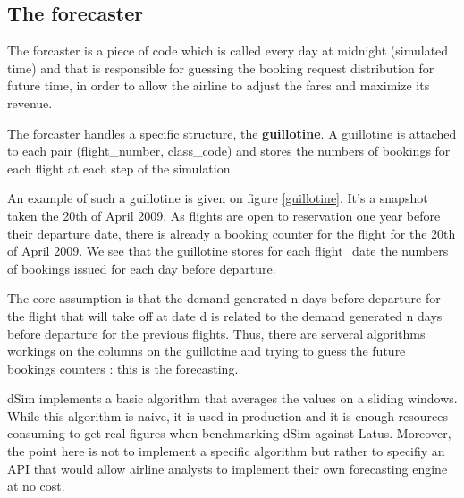 \documentclass[11pt]{JHEP3}
\begin{document}
\subsection{The forecaster}

The forcaster is a piece of code which is called every day at midnight
(simulated time) and that is responsible for guessing the booking
request distribution for future time, in order to allow the airline to
adjust the fares and maximize its revenue.

The forcaster handles a specific structure, the \textbf{guillotine}. A
guillotine is attached to each pair (flight\_number, class\_code) and
stores the numbers of bookings for each flight at each step of the
simulation.


An example of such a guillotine is given on figure
\ref{guillotine}. It's a snapshot taken the 20th of April 2009. As
flights are open to reservation one year before their departure date,
there is already a booking counter for the flight for the 20th of
April 2009. We see that the guillotine stores for each flight\_date
the numbers of bookings issued for each day before departure.

The core assumption is that the demand generated n days before
departure for the flight that will take off at date d is related to
the demand generated n days before departure for the previous
flights. Thus, there are serveral algorithms workings on the columns
on the guillotine and trying to guess the future bookings counters :
this is the forecasting.

dSim implements a basic algorithm that averages the values on a
sliding windows. While this algorithm is naive, it is used in
production and it is enough resources consuming to get real figures
when benchmarking dSim against Latus. Moreover, the point here is not
to implement a specific algorithm but rather to specifiy an API that
would allow airline analysts to implement their own forecasting engine
at no cost.
\end{document}

